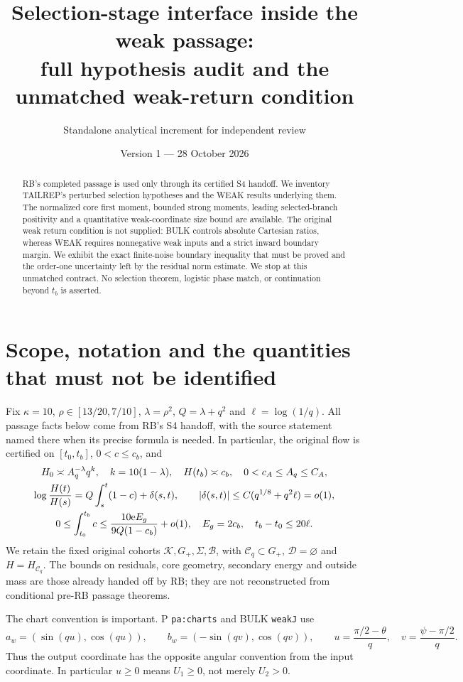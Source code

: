 \documentclass[11pt]{article}
\title{Selection-stage interface inside the weak passage:\\
full hypothesis audit and the unmatched weak-return condition}
\author{Standalone analytical increment for independent review}
\date{Version 1 --- 28 October 2026}
\numberwithin{equation}{section}
\theoremstyle{remark}\newtheorem{remark}[proposition]{Remark}
\newcommand{\KK}{\mathcal K}\newcommand{\BB}{\mathcal B}
\newcommand{\Gp}{G_+}\newcommand{\Clk}{\mathcal C_q}
\begin{document}
\maketitle
\begin{abstract}
RB's completed passage is used only through its certified S4 handoff.
We inventory TAILREP's perturbed selection hypotheses and the WEAK
results underlying them. The normalized core first moment, bounded
strong moments, leading selected-branch positivity and a quantitative
weak-coordinate size bound are available. The original weak return
condition is not supplied: BULK controls absolute Cartesian ratios,
whereas WEAK requires nonnegative weak inputs and a strict inward
boundary margin. We exhibit the exact finite-noise boundary inequality
that must be proved and the order-one uncertainty left by the residual
norm estimate. We stop at this unmatched contract. No selection theorem,
logistic phase match, or continuation beyond $t_b$ is asserted.
\end{abstract}

\section{Scope, notation and the quantities that must not be identified}
\label{an03siv1:scope}
Fix $\kappa=10$, $\rho\in[13/20,7/10]$, $\lambda=\rho^2$,
$Q=\lambda+q^2$ and $\ell=\log(1/q)$. All passage facts below
come from RB's S4 handoff, with the source statement named there
when its precise formula is needed. In particular, the original flow
is certified on $[t_0,t_b]$, $0<c\le c_b$, and
\begin{gather}
 H_0\asymp A_q^{-\lambda}q^k,\quad k=10(1-\lambda),\quad
 H(t_b)\asymp c_b,\quad 0<c_A\le A_q\le C_A,\notag\\
 \log\frac{H(t)}{H(s)}=Q\int_s^t(1-c)+\delta(s,t),\qquad
 |\delta(s,t)|\le C(q^{1/8}+q^2\ell)=o(1),
 \label{an03siv1:handoffclock}\\
 0\le\int_{t_0}^{t_b}c
 \le\frac{10\mathrm e E_g}{9Q(1-c_b)}+o(1),\quad
 E_g=2c_b,\quad t_b-t_0\le20\ell.
 \label{an03siv1:handoffc}
\end{gather}
We retain the fixed original cohorts $\KK,\Gp,\Sigma,\BB$,
with $\Clk\subset\Gp$, $\mathcal D=\varnothing$ and $H=H_{\Clk}$.
The bounds on residuals, core geometry, secondary energy and outside
mass are those already handed off by RB; they are not reconstructed
from conditional pre-RB passage theorems.

The chart convention is important. P \texttt{pa:charts} and BULK
\texttt{weakJ} use
\begin{equation}
 a_w=(\sin(qu),\cos(qu)),\qquad
 b_w=(-\sin(qv),\cos(qv)),\qquad
 u=\frac{\pi/2-\theta}{q},\quad
 v=\frac{\psi-\pi/2}{q}.
 \label{an03siv1:weakcoords}
\end{equation}
Thus the output coordinate has the opposite angular convention from
the input coordinate. In particular $u\ge0$ means $U_1\ge0$, not
merely $U_2>0$.
\end{document}
